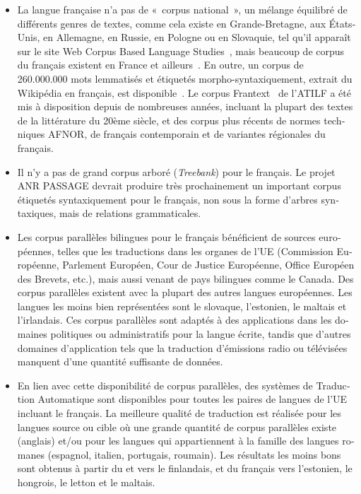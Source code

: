 \begin{french}
\begin{multicols}{2}
\begin{itemize}
\item La langue française n'a pas de «~corpus national~», un mélange équilibré
de différents genres de textes, comme cela existe en Grande-Bretagne,
aux États-Unis, en Allemagne, en Russie, en Pologne ou en Slovaquie,
tel qu'il apparaît sur le site Web Corpus Based Language Studies~\cite{corpuslangstud},
mais beaucoup de corpus du français existent en France et
ailleurs~\cite{corpusfr}. En outre, un corpus de 260.000.000 mots lemmatisés et
étiquetés morpho-syntaxiquement, extrait du Wikipédia en français, est
disponible~\cite{wikipediafr}. Le corpus Frantext~\cite{atilf} de l'ATILF a été mis à disposition
depuis de nombreuses années, incluant la plupart des textes de la
littérature du 20ème siècle, et des corpus plus récents de normes
techniques AFNOR, de français contemporain et de variantes régionales
du français.

\item Il n'y a pas de grand corpus arboré ({\em Treebank}) pour le français. Le projet ANR PASSAGE
devrait produire très prochainement un important corpus étiquetés
syntaxiquement pour le français, non sous la forme d'arbres
syntaxiques, mais de relations grammaticales.

\item Les corpus parallèles bilingues pour le français bénéficient de
sources européennes, telles que les traductions dans les organes de
l'UE (Commission Européenne, Parlement Européen, Cour de Justice
Européenne, Office Européen des Brevets, etc.), mais aussi venant de
pays bilingues comme le Canada. Des corpus parallèles existent avec la
plupart des autres langues européennes. Les langues les moins bien représentées
sont le slovaque, l'estonien, le maltais et l'irlandais. Ces
corpus parallèles sont adaptés à des applications dans les domaines
politiques ou administratifs pour la langue écrite, tandis que
d'autres domaines d'application tels que la traduction d'émissions
radio ou télévisées manquent d'une quantité suffisante de données.

\item En lien avec cette disponibilité de corpus parallèles, des systèmes de
Traduction Automatique sont disponibles pour toutes les paires de
langues de l'UE incluant le français. La meilleure qualité de
traduction est réalisée pour les langues source ou cible où une grande
quantité de corpus parallèles existe (anglais) et/ou pour les langues
qui appartiennent à la famille des langues romanes (espagnol, italien,
portugais, roumain). Les résultats les moins bons sont obtenus à partir du et
vers le finlandais, et du français vers l'estonien, le hongrois, le
letton et le maltais.


\end{itemize}
\end{multicols}
\end{french}
